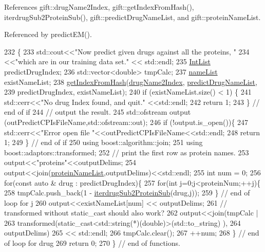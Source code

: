 References gift\+::drug\+Name2\+Index, gift\+::get\+Index\+From\+Hash(), iterdrug\+Sub2\+Protein\+Sub(), gift\+::predict\+Drug\+Name\+List, and gift\+::protein\+Name\+List.



Referenced by predict\+E\+M().


\begin{DoxyCode}
232                       \{
233     std::cout<<\textcolor{stringliteral}{"Now predict given drugs against all the proteins, "}
234              <<\textcolor{stringliteral}{"which are in our training data set."} << std::endl;
235     \hyperlink{namespacegift_a786390fe70b2e3b6d61dba1014651f03}{IntList} predictDrugIndex;
236     std::vector<double> tmpCalc;
237     \hyperlink{namespacegift_a62f85efaab3bff48335863ae0670c7a7}{nameList} existNameList;
238     \hyperlink{namespacegift_a835110af070bdfb37d092c6a7f79d65c}{getIndexFromHash}(\hyperlink{namespacegift_a3385bc2f0aa26289e7f7d69635207e5d}{drugName2Index}, 
      \hyperlink{namespacegift_a9cc6da68eeea28ac6c6a65cd9f248e5b}{predictDrugNameList},
239                      predictDrugIndex, existNameList);
240     \textcolor{keywordflow}{if} (existNameList.size() < 1) \{
241       std::cerr<<\textcolor{stringliteral}{"No drug Index found, and quit."} <<std::endl;
242       \textcolor{keywordflow}{return} 1;
243     \} \textcolor{comment}{// end of if}
244     \textcolor{comment}{// output the result.}
245     std::ofstream output (outPredictCPIsFileName,std::ofstream::out);
246     \textcolor{keywordflow}{if} (!output.is\_open())\{
247       std::cerr<<\textcolor{stringliteral}{"Error open file "}<<outPredictCPIsFileName<<std::endl;
248       \textcolor{keywordflow}{return} 1;
249     \} \textcolor{comment}{// end of if}
250     \textcolor{keyword}{using} boost::algorithm::join;
251     \textcolor{keyword}{using} boost::adaptors::transformed;
252     \textcolor{comment}{// print the first row as protein names.}
253     output<<\textcolor{stringliteral}{"proteins"}<<outputDelims;
254     output<<join(\hyperlink{namespacegift_ac03221463832a0531081c053ed10bafd}{proteinNameList},outputDelims)<<std::endl;
255     \textcolor{keywordtype}{int} num = 0;
256     \textcolor{keywordflow}{for}(\textcolor{keyword}{const} \textcolor{keyword}{auto} & drug : predictDrugIndex)\{
257       \textcolor{keywordflow}{for}(\textcolor{keywordtype}{int} j=0;j<proteinNum;++j)\{
258         tmpCalc.push\_back(1 - \hyperlink{classgift_1_1_e_m_a863e912e64db27bae204f088649dee39}{iterdrugSub2ProteinSub}(drug,j));
259       \} \textcolor{comment}{// end of loop for j}
260       output<<existNameList[num] << outputDelims;
261       \textcolor{comment}{// transformed without static\_cast should also work?}
262       output<<join(tmpCalc |
263               transformed(\textcolor{keyword}{static\_cast<}std::string(*)(\textcolor{keywordtype}{double})\textcolor{keyword}{>}(std::to\_string) ),
264                    outputDelims)
265             << std::endl;
266       tmpCalc.clear();
267       ++num;
268     \} \textcolor{comment}{// end of loop for drug}
269     \textcolor{keywordflow}{return} 0;
270   \} \textcolor{comment}{// end of functions.}
\end{DoxyCode}
